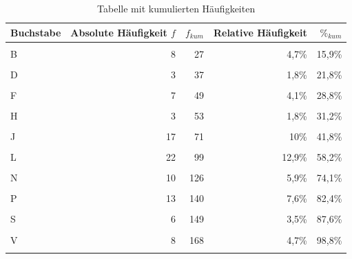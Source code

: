 \documentclass[
  11pt,
  ngerman,
  a4paper,
]{report}
\begin{document}
\begin{table}

\caption{\label{tab:haeufkum}Tabelle mit kumulierten Häufigkeiten}
\centering
\begin{tabular}[t]{lrrrr}
\toprule
\textbf{Buchstabe} & \textbf{Absolute Häufigkeit $f$} & \textbf{$f_{kum}$} & \textbf{Relative Häufigkeit} & \textbf{$\%_{kum}$}\\
\midrule
\cellcolor{gray!6}{A} & \cellcolor{gray!6}{19} & \cellcolor{gray!6}{19} & \cellcolor{gray!6}{11,2\%} & \cellcolor{gray!6}{11,2\%}\\
B & 8 & 27 & 4,7\% & 15,9\%\\
\cellcolor{gray!6}{C} & \cellcolor{gray!6}{7} & \cellcolor{gray!6}{34} & \cellcolor{gray!6}{4,1\%} & \cellcolor{gray!6}{20\%}\\
D & 3 & 37 & 1,8\% & 21,8\%\\
\cellcolor{gray!6}{E} & \cellcolor{gray!6}{5} & \cellcolor{gray!6}{42} & \cellcolor{gray!6}{2,9\%} & \cellcolor{gray!6}{24,7\%}\\
F & 7 & 49 & 4,1\% & 28,8\%\\
\cellcolor{gray!6}{G} & \cellcolor{gray!6}{1} & \cellcolor{gray!6}{50} & \cellcolor{gray!6}{0,6\%} & \cellcolor{gray!6}{29,4\%}\\
H & 3 & 53 & 1,8\% & 31,2\%\\
\cellcolor{gray!6}{I} & \cellcolor{gray!6}{1} & \cellcolor{gray!6}{54} & \cellcolor{gray!6}{0,6\%} & \cellcolor{gray!6}{31,8\%}\\
J & 17 & 71 & 10\% & 41,8\%\\
\cellcolor{gray!6}{K} & \cellcolor{gray!6}{6} & \cellcolor{gray!6}{77} & \cellcolor{gray!6}{3,5\%} & \cellcolor{gray!6}{45,3\%}\\
L & 22 & 99 & 12,9\% & 58,2\%\\
\cellcolor{gray!6}{M} & \cellcolor{gray!6}{17} & \cellcolor{gray!6}{116} & \cellcolor{gray!6}{10\%} & \cellcolor{gray!6}{68,2\%}\\
N & 10 & 126 & 5,9\% & 74,1\%\\
\cellcolor{gray!6}{O} & \cellcolor{gray!6}{1} & \cellcolor{gray!6}{127} & \cellcolor{gray!6}{0,6\%} & \cellcolor{gray!6}{74,7\%}\\
P & 13 & 140 & 7,6\% & 82,4\%\\
\cellcolor{gray!6}{R} & \cellcolor{gray!6}{3} & \cellcolor{gray!6}{143} & \cellcolor{gray!6}{1,8\%} & \cellcolor{gray!6}{84,1\%}\\
S & 6 & 149 & 3,5\% & 87,6\%\\
\cellcolor{gray!6}{T} & \cellcolor{gray!6}{11} & \cellcolor{gray!6}{160} & \cellcolor{gray!6}{6,5\%} & \cellcolor{gray!6}{94,1\%}\\
V & 8 & 168 & 4,7\% & 98,8\%\\
\cellcolor{gray!6}{Y} & \cellcolor{gray!6}{2} & \cellcolor{gray!6}{170} & \cellcolor{gray!6}{1,2\%} & \cellcolor{gray!6}{100\%}\\
\bottomrule
\end{tabular}
\end{table}
\end{document}
